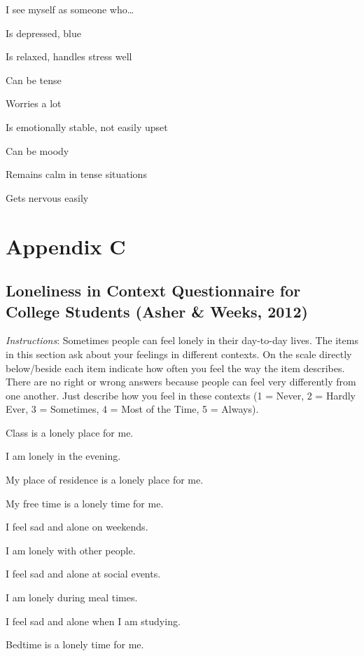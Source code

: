 \documentclass[
  english,
  man]{apa6}
\begin{document}
I see myself as someone who\ldots{}

Is depressed, blue

Is relaxed, handles stress well

Can be tense

Worries a lot

Is emotionally stable, not easily upset

Can be moody

Remains calm in tense situations

Gets nervous easily

\newpage

\section{Appendix C}\label{appendix-c}

\subsection{Loneliness in Context Questionnaire for College Students (Asher \& Weeks, 2012)}\label{loneliness-in-context-questionnaire-for-college-students-asher-weeks-2012}

\emph{Instructions}: Sometimes people can feel lonely in their day-to-day lives. The items in this section ask about your feelings in different contexts. On the scale directly below/beside each item indicate how often you feel the way the item describes. There are no right or wrong answers because people can feel very differently from one another. Just describe how you feel in these contexts (1 = Never, 2 = Hardly Ever, 3 = Sometimes, 4 = Most of the Time, 5 = Always).

Class is a lonely place for me.

I am lonely in the evening.

My place of residence is a lonely place for me.

My free time is a lonely time for me.

I feel sad and alone on weekends.

I am lonely with other people.

I feel sad and alone at social events.

I am lonely during meal times.

I feel sad and alone when I am studying.

Bedtime is a lonely time for me.
\end{document}
